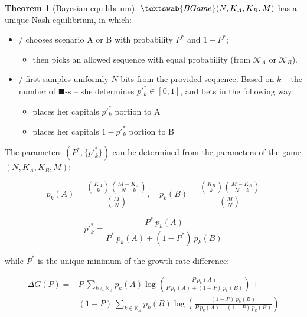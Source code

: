 \documentclass{article}
\newcommand{\bb}{\blacksquare}
\theoremstyle{definition}
\newtheorem{theorem}{Theorem}[section]
\newcommand{\BG}[1]{$\textswab{BGame}(#1)$}
\begin{document}
\begin{theorem}[Bayesian equilibrium]
\label{thm:Bayesian}
\BG{N,K_A,K_B,M} has a unique Nash equilibrium, in which:

\begin{itemize}
    \item \PII/ chooses scenario A or B with probability $P^*$ and $1-P^*$;
    \begin{itemize}
        \item then picks an allowed sequence with equal probability (from $\mathcal{K}_A$ or $\mathcal{K}_B$).
    \end{itemize}

    \item \PI/ first samples uniformly $N$ bits from the provided sequence. Based on $k$ -- the number of $\bb$-s -- she determines $p'^*_k \in [0,1]$, and bets in the following way:
    \begin{itemize}
        \item places her capitals $p'^*_k$ portion to A
        \item places her capitals $1-p'^*_k$ portion to B
    \end{itemize}
\end{itemize}

The parameters $(P^*, \{p'^*_k\})$ can be determined from the parameters of the game $(N, K_A, K_B, M)$:

\begin{equation}
    \label{thm:BayesEqHypergeom}
    p_k(A) = \frac{\binom{K_A}{k} \binom{M-K_A}{N-k}}{\binom{M}{N}}, \quad
    p_k(B) = \frac{\binom{K_B}{k} \binom{M-K_B}{N-k}}{\binom{M}{N}}
\end{equation}

\begin{equation}
    p'^*_k = \frac{P^* \ p_k(A)}{P^* \ p_k(A) + (1-P^*) \ p_k(B)}
\end{equation}

while $P^*$ is the unique minimum of the growth rate difference:

\begin{equation}
    \begin{split}
        \Delta G(P)=&P \ \sum_{k \in \mathbb{K}_A} p_k(A) \log \left ( \frac{P \ p_k(A)}{P \ p_k(A)+(1-P) \ p_k(B)} \right ) + \\
                    &(1-P) \ \sum_{k \in \mathbb{K}_B} p_k(B) \log \left ( \frac{(1-P) \ p_k(B)}{P \  p_k(A)+(1-P) \ p_k(B)} \right )
    \end{split}
\end{equation}



\end{theorem}
\end{document}
